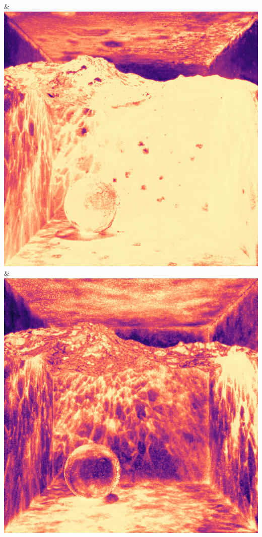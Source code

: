 & \includegraphics[width=\linewidth]{figures/py/tests/quality_comparison/nrc+pt+sl_1spp_caustics_small_flip.png}
& \includegraphics[width=\linewidth]{figures/py/tests/quality_comparison/nrc+bt_1spp_caustics_small_flip.png}
